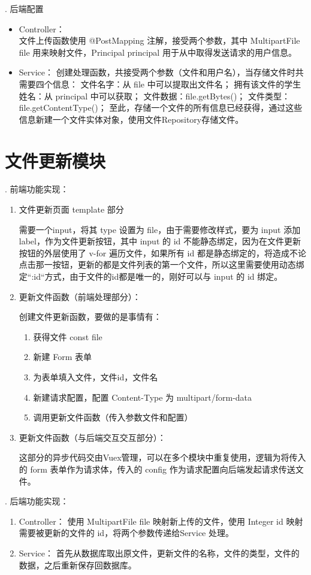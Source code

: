 . 后端配置

\begin{itemize}
  \item Controller：\\
        文件上传函数使用 @PostMapping 注解，接受两个参数，其中 MultipartFile file 用来映射文件，Principal principal 用于从中取得发送请求的用户信息。
  \item Service：
        创建处理函数，共接受两个参数（文件和用户名），当存储文件时共需要四个信息：
        文件名字：从 file 中可以提取出文件名；
        拥有该文件的学生姓名：从 principal 中可以获取；
        文件数据：file.getBytes()；
        文件类型：file.getContentType()；
        至此，存储一个文件的所有信息已经获得，通过这些信息新建一个文件实体对象，使用文件Repository存储文件。
\end{itemize}

\section{文件更新模块}

. 前端功能实现：
\begin{enumerate}[label=\circled{\arabic*}]
  \item 文件更新页面 template 部分

        需要一个input，将其 type 设置为 file，由于需要修改样式，要为 input 添加 label，作为文件更新按钮，其中 input 的 id 不能静态绑定，因为在文件更新按钮的外层使用了 v-for 遍历文件，如果所有 id 都是静态绑定的，将造成不论点击那一按钮，更新的都是文件列表的第一个文件，所以这里需要使用动态绑定“:id“方式，由于文件的id都是唯一的，刚好可以与 input 的 id 绑定。
  \item 更新文件函数（前端处理部分）：

        创建文件更新函数，要做的是事情有：
        \begin{enumerate}
          \item 获得文件 const file
          \item 新建 Form 表单
          \item 为表单填入文件，文件id，文件名
          \item 新建请求配置，配置 Content-Type 为 multipart/form-data
          \item 调用更新文件函数（传入参数文件和配置）
        \end{enumerate}
  \item 更新文件函数（与后端交互交互部分）：

        这部分的异步代码交由Vuex管理，可以在多个模块中重复使用，逻辑为将传入的 form 表单作为请求体，传入的 config 作为请求配置向后端发起请求传送文件。
\end{enumerate}
. 后端功能实现：
\begin{enumerate}
  \item Controller：
        使用 MultipartFile file 映射新上传的文件，使用 Integer id 映射需要被更新的文件的 id，将两个参数传递给Service 处理。
  \item Service：
        首先从数据库取出原文件，更新文件的名称，文件的类型，文件的数据，之后重新保存回数据库。
\end{enumerate}

